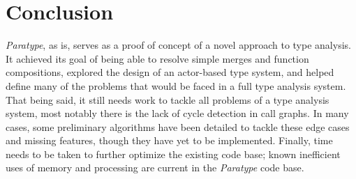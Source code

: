 \documentclass{acm_proc_article-sp}
\begin{document}
%
%
%
%
%
%
%
%
%
%









\section{Conclusion}

\emph{Paratype}, as is, serves as a proof of concept of a novel approach to
type analysis. It achieved its goal of being able to resolve simple merges and
function compositions, explored the design of an actor-based type system, and
helped define many of the problems that would be faced in a full type analysis
system. That being said, it still needs work to tackle all problems of a type
analysis system, most notably there is the lack of cycle detection in call
graphs. In many cases, some preliminary algorithms have been detailed to tackle
these edge cases and missing features, though they have yet to be implemented.
Finally, time needs to be taken to further optimize the existing code base;
known inefficient uses of memory and processing are current in the
\emph{Paratype} code base.
\end{document}

